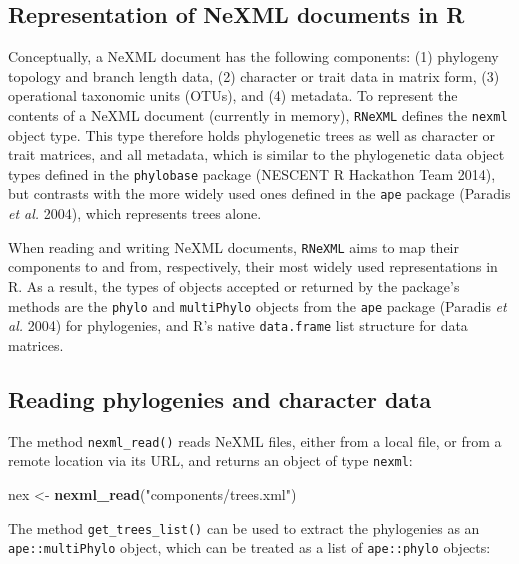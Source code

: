 \documentclass[author-year, review, 11pt]{elsarticle} %
\newenvironment{Shaded}{\begin{snugshade}}{\end{snugshade}}
\newcommand{\KeywordTok}[1]{\textcolor[rgb]{0.13,0.29,0.53}{\textbf{{#1}}}}
\newcommand{\StringTok}[1]{\textcolor[rgb]{0.31,0.60,0.02}{{#1}}}
\newcommand{\NormalTok}[1]{{#1}}
\begin{document}
\subsection{Representation of NeXML documents in
R}\label{representation-of-nexml-documents-in-r}

Conceptually, a NeXML document has the following components: (1)
phylogeny topology and branch length data, (2) character or trait data
in matrix form, (3) operational taxonomic units (OTUs), and (4)
metadata. To represent the contents of a NeXML document (currently in
memory), \texttt{RNeXML} defines the \texttt{nexml} object type. This
type therefore holds phylogenetic trees as well as character or trait
matrices, and all metadata, which is similar to the phylogenetic data
object types defined in the \texttt{phylobase} package (NESCENT R
Hackathon Team 2014), but contrasts with the more widely used ones
defined in the \texttt{ape} package (Paradis \emph{et al.} 2004), which
represents trees alone.

When reading and writing NeXML documents, \texttt{RNeXML} aims to map
their components to and from, respectively, their most widely used
representations in R. As a result, the types of objects accepted or
returned by the package's methods are the \texttt{phylo} and
\texttt{multiPhylo} objects from the \texttt{ape} package (Paradis
\emph{et al.} 2004) for phylogenies, and R's native \texttt{data.frame}
list structure for data matrices.

\subsection{Reading phylogenies and character
data}\label{reading-phylogenies-and-character-data}

The method \texttt{nexml\_read()} reads NeXML files, either from a local
file, or from a remote location via its URL, and returns an object of
type \texttt{nexml}:

\begin{Shaded}
\begin{Highlighting}[]
\NormalTok{nex <-}\StringTok{ }\KeywordTok{nexml_read}\NormalTok{(}\StringTok{"components/trees.xml"}\NormalTok{)}
\end{Highlighting}
\end{Shaded}

The method \texttt{get\_trees\_list()} can be used to extract the
phylogenies as an \texttt{ape::multiPhylo} object, which can be treated
as a list of \texttt{ape::phylo} objects:
\end{document}
